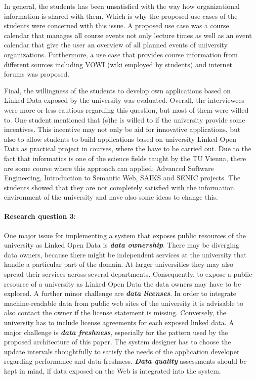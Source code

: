 \documentclass{article}
\begin{document}
In general, the students has been unsatisfied with the way how organizational information is shared with them. Which is why the proposed use cases of the students were concerned with this issue. A proposed use case was a course calendar that manages all course events not only lecture times as well as an event calendar that give the user an overview of all planned events of university organizations. Furthermore, a use case that provides course information from different sources including VOWI (wiki employed by students) and internet forums was proposed.

Final, the willingness of the students to develop own applications based on Linked Data exposed by the university was evaluated. Overall, the interviewees were more or less cautious regarding this question, but most of them were willed to. One student mentioned that (s)he is willed to if the university provide some incentives. This incentive may not only be aid for innovative applications, but also to allow students to build applications based on university Linked Open Data as practical project in courses, where the have to be carried out. Due to the fact that informatics is one of the science fields taught by the TU Vienna, there are some course where this approach can applied; Advanced Software Engineering, Introduction to Semantic Web, SAIKS and SENIC projects. The students showed that they are not completely satisfied with the information environment of the university and have also some ideas to change this.

\paragraph{Research question 3:} One major issue for implementing a system that exposes public resources of the university as Linked Open Data is \textbf{\textit{data ownership}}. There may be diverging data owners, because there might be independent services at the university that handle a particular part of the domain. At larger universities they may also spread their services across several departments. Consequently, to expose a public resource of a university as Linked Open Data the data owners may have to be explored. A further minor challenge are \textbf{\textit{data licenses}}. In order to integrate machine-readable data from public web sites of the university it is advisable to also contact the owner if the license statement is missing. Conversely, the university has to include license agreements for each exposed linked data. A major challenge is \textbf{\textit{data freshness}}, especially for the pattern used by the proposed architecture of this paper. The system designer has to choose the update intervals thoughtfully to satisfy the needs of the application developer regarding performance and data freshness. \textit{\textbf{Data quality}} assessments should be kept in mind, if data exposed on the Web is integrated into the system.
\end{document}
